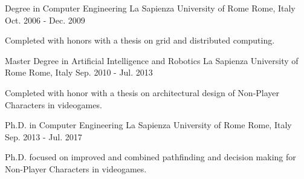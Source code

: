 


\begin{cventries}


\cventry
{Degree in Computer Engineering} %
{La Sapienza University of Rome} %
{Rome, Italy} %
{Oct. 2006 - Dec. 2009} %
{ %
\begin{cvitems}
\item {Completed with honors with a thesis on grid and distributed computing.}
\end{cvitems}
}

\cventry
{Master Degree in Artificial Intelligence and Robotics} %
{La Sapienza University of Rome} %
{Rome, Italy} %
{Sep. 2010 - Jul. 2013} %
{ %
\begin{cvitems}
	\item {Completed with honor with a thesis on architectural design of Non-Player Characters in videogames.}
\end{cvitems}
}

\cventry
{Ph.D. in Computer Engineering} %
{La Sapienza University of Rome} %
{Rome, Italy} %
{Sep. 2013 - Jul. 2017} %
{ %
\begin{cvitems}
	\item {Ph.D. focused on improved and combined pathfinding and decision making for Non-Player Characters in videogames.}
\end{cvitems}
}


\end{cventries}
